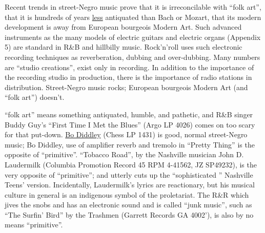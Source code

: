 Recent trends in street-Negro music prove that it is irreconcilable 
with \enquote{folk art}, that it is hundreds of years \uline{less} antiquated than Bach or 
Mozart, that its modern development is away from European bourgeois Modern 
Art. Such advanced instruments as the many models of electric guitars and 
electric organs (Appendix 5) are standard in R\&B and hillbilly music. Rock'n'roll 
uses such electronic recording techniques as reverberation, dubbing
and over-dubbing. Many numbers are \enquote{studio creations}, exist only in recording.
In addition to the importance of the recording studio in production, there 
is the importance of radio stations in distribution. Street-Negro music rocks;
European bourgeois Modern Art (and \enquote{folk art}) doesn't. 

\enquote{folk art} means something antiquated, humble, and pathetic, and R\&B singer
Buddy Guy's \enquote{First Time I Met the Blues} (Argo LP 4026) comes on too scary for
that put-down. \uline{Bo Diddley} (Chess LP 1431) is good, normal street-Negro music; 
Bo Diddley, use of amplifier reverb and tremolo in \enquote{Pretty Thing} is the 
opposite of \enquote{primitive}. \enquote{Tobacco Road}, by the Nashville musician John D. 
Laudermilk (Columbia Promotion Record 45 RPM 4-41562, JZ SP49232), is the very 
opposite of \enquote{primitive}; and utterly cuts up the \enquote{sophisticated } Nashville Teens'
version. Incidentally, Laudermilk's lyrics are reactionary, but his musical
culture in general is an indigenous symbol of the proletariat. The R\&R which 
jives the snobs and has an electronic sound and is called \enquote{junk music}, such
as \enquote{The Surfin' Bird} by the Trashmen (Garrett Records GA 4002'), is also
by no means \enquote{primitive}. 

